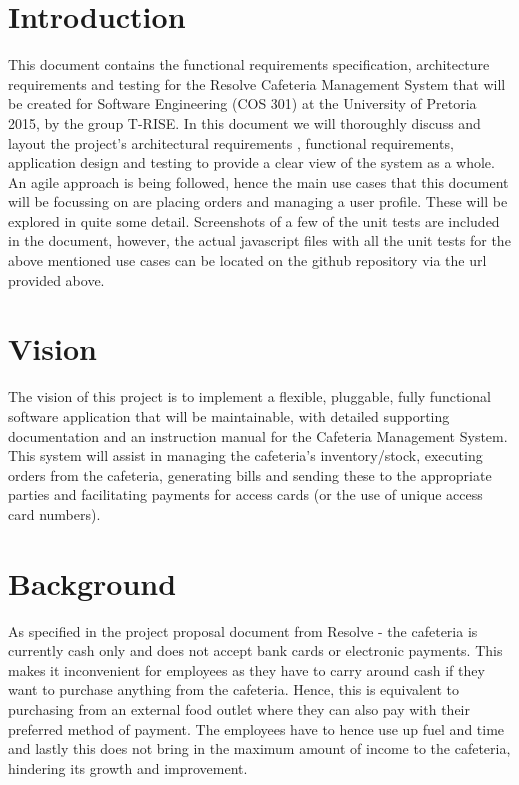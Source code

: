 \documentclass[12pt]{article}
\begin{document}
\maketitle
\break

\tableofcontents
\break


\section{Introduction}
This document contains the functional requirements specification, architecture requirements and testing for the Resolve Cafeteria Management System that will be created for Software Engineering (COS 301) at the University of Pretoria 2015, by the group T-RISE. In this document we will thoroughly discuss and layout the project's architectural requirements , functional requirements, application design and testing to provide a clear view of the system as a whole. An agile approach is being followed, hence the main use cases that this document will be focussing on are placing orders and managing a user profile. These will be explored in quite some detail. Screenshots of a few of the unit tests are included in the document, however, the actual javascript files with all the unit tests for the above mentioned use cases can be located on the github repository via the url provided above. 

\section{Vision}
The vision of this project is to implement a flexible, pluggable, fully functional software application that will be maintainable, with detailed supporting documentation and an instruction manual for the Cafeteria Management System. This system will assist in managing the cafeteria's inventory/stock, executing orders from the cafeteria, generating bills and sending these to the appropriate parties and facilitating payments for access cards (or the use of unique access card numbers). 

\section{Background}
As specified in the project proposal document from Resolve - the cafeteria is currently cash only and does not accept bank cards or electronic payments. This makes it inconvenient for employees as they have to carry around cash if they want to purchase anything from the cafeteria. Hence, this is equivalent to purchasing from an external food outlet where they can also pay with their preferred method of payment. The employees have to hence use up fuel and time and lastly this does not bring in the maximum amount of income to the cafeteria, hindering its growth and improvement.\\
\end{document}

